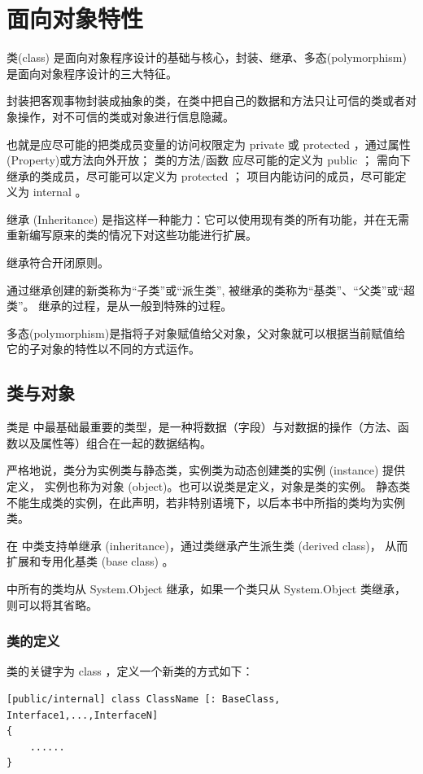 
\chapter{\cs 面向对象特性}

类(class) 是面向对象程序设计的基础与核心，封装、继承、多态(polymorphism)是面向对象程序设计的三大特征。

封装把客观事物封装成抽象的类，在类中把自己的数据和方法只让可信的类或者对象操作，对不可信的类或对象进行信息隐藏。

也就是应尽可能的把类成员变量的访问权限定为 private 或 protected ，通过属性(Property)或方法向外开放；
类的方法/函数 应尽可能的定义为 public ；
需向下继承的类成员，尽可能可以定义为 protected ；
项目内能访问的成员，尽可能定义为 internal 。

继承 (Inheritance) 是指这样一种能力：它可以使用现有类的所有功能，并在无需重新编写原来的类的情况下对这些功能进行扩展。

继承符合开闭原则。

通过继承创建的新类称为“子类”或“派生类”, 被继承的类称为“基类”、“父类”或“超类”。
继承的过程，是从一般到特殊的过程。

多态(polymorphism)是指将子对象赋值给父对象，父对象就可以根据当前赋值给它的子对象的特性以不同的方式运作。


\section{类与对象}
类是 \cs 中最基础最重要的类型，是一种将数据（字段）与对数据的操作（方法、函数以及属性等）组合在一起的数据结构。

严格地说，类分为实例类与静态类，实例类为动态创建类的实例 (instance) 提供定义，
实例也称为对象 (object)。也可以说类是定义，对象是类的实例。
静态类不能生成类的实例，在此声明，若非特别语境下，以后本书中所指的类均为实例类。

在 \cs 中类支持单继承 (inheritance)，通过类继承产生派生类 (derived class)， 
从而扩展和专用化基类 (base class) 。

 \cs 中所有的类均从 System.Object 继承，如果一个类只从 System.Object 类继承，
 则可以将其省略。

 \subsection{类的定义}

类的关键字为 class ，定义一个新类的方式如下：

\begin{lstlisting}
[public/internal] class ClassName [: BaseClass, Interface1,...,InterfaceN]
{
    ......
}
\end{lstlisting}

